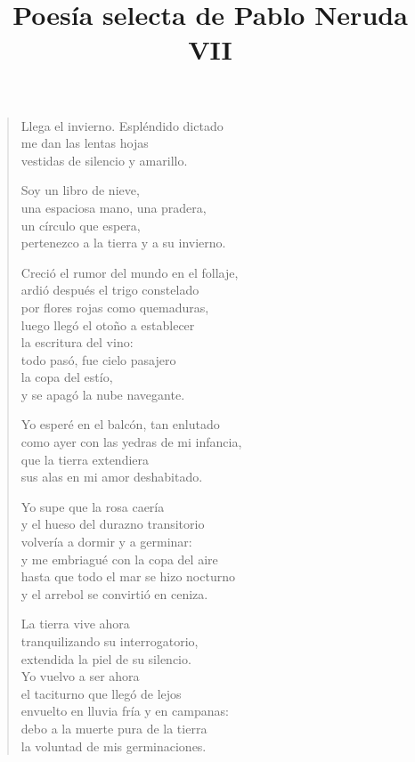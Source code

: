 \documentclass[12pt]{article}
\date{}
\title{Poesía selecta de Pablo Neruda VII}
\begin{document}
\maketitle
\tableofcontents
\clearpage
{}
\begin{verse}

Llega el invierno. Espléndido dictado\\
me dan las lentas hojas\\
vestidas de silencio y amarillo.  

Soy un libro de nieve,\\
una espaciosa mano, una pradera,\\
un círculo que espera,\\
pertenezco a la tierra y a su invierno.  

Creció el rumor del mundo en el follaje,\\
ardió después el trigo constelado\\
por flores rojas como quemaduras,\\
luego llegó el otoño a establecer\\
la escritura del vino:\\
todo pasó, fue cielo pasajero\\
la copa del estío,\\
y se apagó la nube navegante.  

Yo esperé en el balcón, tan enlutado\\
como ayer con las yedras de mi infancia,\\
que la tierra extendiera\\
sus alas en mi amor deshabitado.  

Yo supe que la rosa caería\\
y el hueso del durazno transitorio\\
volvería a dormir y a germinar:\\
y me embriagué con la copa del aire\\
hasta que todo el mar se hizo nocturno\\
y el arrebol se convirtió en ceniza.  

La tierra vive ahora\\
tranquilizando su interrogatorio,\\
extendida la piel de su silencio.\\
Yo vuelvo a ser ahora\\
el taciturno que llegó de lejos\\
envuelto en lluvia fría y en campanas:\\
debo a la muerte pura de la tierra\\
la voluntad de mis germinaciones.  

\end{verse}
\end{document}
